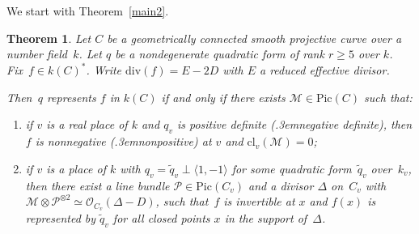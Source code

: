 \documentclass{amsart}
\newtheorem{thm}{Theorem}[section]
\theoremstyle{definition}
\theoremstyle{remark}
\numberwithin{equation}{section}
\newcommand{\cl}{\mathrm{cl}}
\newcommand{\Pic}{\mathrm{Pic}}
\newcommand{\ddiv}{\mathrm{div}}
\def\resp {\text{resp.}\kern.3em}
\def\cM{\mathcal{M}}
\def\cO{\mathcal{O}}
\def\cM{\mathcal{M}}
\def\cP{\mathcal{P}}
\def\tq{\tilde{q}}
\begin{document}
We start with Theorem~\ref{main2}. 

\begin{thm}
\label{main2bis}
Let $C$ be a geometrically connected smooth projective curve over a number field~$k$. Let $q$ be a nondegenerate quadratic form of rank $r\geq 5$ over $k$. Fix~$f\in k(C)^*$. Write $\ddiv(f)=E-2D$ with $E$ a reduced effective divisor.

 Then~$q$ represents $f$ in $k(C)$ if and only if there exists $\cM\in\Pic(C)$
such that:
\begin{enumerate}[label=(\roman*)] 
\item
\label{itext}
 if $v$ is a real place of $k$ and $q_v$ is positive definite (\resp negative definite), then $f$ is nonnegative  (\resp nonpositive) at $v$ and $\cl_v(\cM)=0$;
 \item
 \label{iitext}
if $v$ is a place of $k$ with $q_v=\tilde{q}_v\perp\langle 1,-1\rangle$ for some quadratic form~$\tq_v$ over~$k_v$, then
there exist a line bundle $\cP\in\Pic(C_v)$ and a divisor $\Delta$ on~$C_v$ with ${\cM\otimes\cP^{\otimes 2}\simeq\cO_{C_v}(\Delta-D)}$, such that~$f$ is invertible at $x$ and $f(x)$ is represented by $\tilde{q}_v$ for all closed points $x$ in the support of~$\Delta$.
\end{enumerate}
\end{thm}
\end{document}
